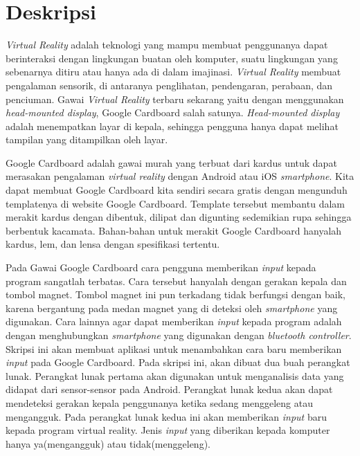 \documentclass[a4paper,twoside]{article}
\begin{document}
\title{\@judultopik}
\author{\nama \textendash \@npm} 

\newcommand{\nama}{Ega Prianto}
\newcommand{\@npm}{2013730047}
\newcommand{\@judultopik}{Deteksi Gerakan Kepala dengan Google Cardboard} %
\newcommand{\jumpemb}{1} %
\newcommand{\tanggal}{02/08/2016}
\maketitle


\section{Deskripsi}
\textit{Virtual Reality} adalah teknologi yang mampu membuat penggunanya dapat berinteraksi dengan lingkungan buatan oleh komputer, suatu lingkungan yang sebenarnya ditiru atau hanya ada di dalam imajinasi. \textit{Virtual Reality} membuat pengalaman sensorik, di antaranya penglihatan, pendengaran, perabaan, dan penciuman. Gawai \textit{Virtual Reality} terbaru sekarang yaitu dengan menggunakan \textit{head-mounted display}, Google Cardboard salah satunya. \textit{Head-mounted display} adalah menempatkan layar di kepala, sehingga pengguna hanya dapat melihat tampilan yang ditampilkan oleh layar.

Google Cardboard adalah gawai murah yang terbuat dari kardus untuk dapat merasakan pengalaman \textit{virtual reality} dengan Android atau iOS \textit{smartphone}. Kita dapat membuat Google Cardboard kita sendiri secara gratis dengan mengunduh templatenya di website Google Cardboard. Template tersebut membantu dalam merakit kardus dengan dibentuk, dilipat dan digunting sedemikian rupa sehingga berbentuk kacamata. Bahan-bahan untuk merakit Google Cardboard hanyalah kardus, lem, dan lensa dengan spesifikasi tertentu.

Pada Gawai Google Cardboard cara pengguna memberikan \textit{input} kepada program sangatlah terbatas. Cara tersebut hanyalah dengan gerakan kepala dan tombol magnet. Tombol magnet ini pun terkadang tidak berfungsi dengan baik, karena bergantung pada medan magnet yang di deteksi oleh \textit{smartphone} yang digunakan. Cara lainnya agar dapat memberikan \textit{input} kepada program adalah dengan menghubungkan \textit{smartphone} yang digunakan dengan \textit{bluetooth controller}. 
Skripsi ini akan membuat aplikasi untuk menambahkan cara baru  memberikan \textit{input} pada Google Cardboard. Pada skripsi ini, akan dibuat dua buah perangkat lunak. Perangkat lunak pertama akan digunakan untuk menganalisis data yang didapat dari sensor-sensor pada Android. Perangkat lunak kedua akan dapat mendeteksi gerakan kepala penggunanya ketika sedang menggeleng atau mengangguk. Pada perangkat lunak kedua ini akan memberikan \textit{input} baru kepada program virtual reality. Jenis \textit{input} yang diberikan kepada komputer hanya ya(mengangguk) atau tidak(menggeleng).
\end{document}
